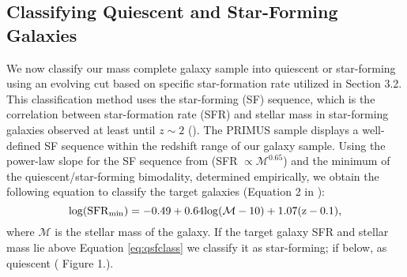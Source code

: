 \documentclass{emulateapj}
\begin{document}
\subsection{Classifying Quiescent and Star-Forming Galaxies} \label{sec:sfq}
We now classify our mass complete galaxy sample into quiescent or star-forming using an evolving cut based on specific star-formation rate utilized in \cite{Moustakas:2013aa} Section 3.2. This classification method uses the star-forming (SF) sequence, which is the correlation between star-formation rate (SFR) and stellar mass in star-forming galaxies observed at least until $z \sim 2$ (\citealt{Noeske:2007aa, Williams:2009aa, Karim:2011aa}). The PRIMUS sample displays a well-defined SF sequence within the redshift range of our galaxy sample. Using the power-law slope for the SF sequence from \cite{Salim:2007aa} (SFR $\propto \mathcal{M}^{0.65}$) and the minimum of the quiescent/star-forming bimodality, determined empirically, we obtain the following equation to classify the target galaxies (Equation 2 in \citealt{Moustakas:2013aa}):
\begin{equation} \label{eq:qsfclass} 
\rm{log}(\rm{SFR}_{\rm{min}}) = -0.49 + 0.64 \rm{log}(\mathcal{M} - 10) +1.07(z-0.1), 
\end{equation} 
where $\mathcal{M}$ is the stellar mass of the galaxy. If the target galaxy SFR and stellar mass lie above Equation \ref{eq:qsfclass} we classify it as star-forming; if below, as quiescent (\citealt{Moustakas:2013aa} Figure 1.).
\end{document}
